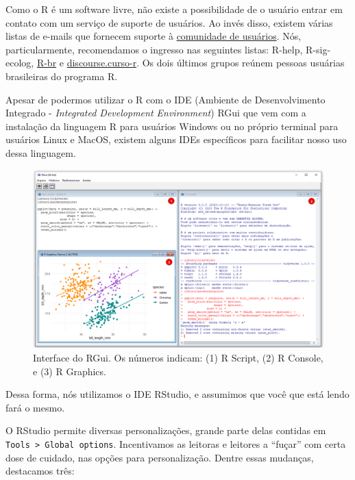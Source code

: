 \documentclass[
]{article}
\begin{document}
Como o R é um software livre, não existe a possibilidade de o usuário entrar em contato com um serviço de suporte de usuários. Ao invés disso, existem várias listas de e-mails que fornecem suporte à \href{http://www.r-project.org/mail.html}{comunidade de usuários}. Nós, particularmente, recomendamos o ingresso nas seguintes listas: R-help, R-sig-ecolog, \href{http://www.leg.ufpr.br/doku.php/software:rbr}{R-br} e \href{https://discourse.curso-r.com/}{discourse.curso-r}. Os dois últimos grupos reúnem pessoas usuárias brasileiras do programa R.

Apesar de podermos utilizar o R com o IDE (Ambiente de Desenvolvimento Integrado - \emph{Integrated Development Environment}) RGui que vem com a instalação da linguagem R para usuários Windows ou no próprio terminal para usuários Linux e MacOS, existem alguns IDEs específicos para facilitar nosso uso dessa linguagem.

\begin{figure}

{\centering \includegraphics[width=0.75\linewidth,height=0.75\textheight]{figures/cap04_fig01} 

}

\caption{Interface do RGui. Os números indicam: (1) R Script, (2) R Console, e (3) R Graphics.}\label{fig:fig-rgui}
\end{figure}

Dessa forma, nós utilizamos o IDE RStudio, e assumimos que você que está lendo fará o mesmo.

O RStudio permite diversas personalizações, grande parte delas contidas em \texttt{Tools\ \textgreater{}\ Global\ options}. Incentivamos as leitoras e leitores a ``fuçar'' com certa dose de cuidado, nas opções para personalização. Dentre essas mudanças, destacamos três:
\end{document}
